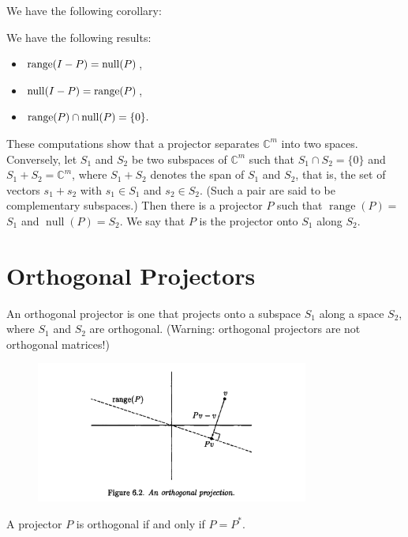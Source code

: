 We have the following corollary:

\begin{corollary}
\label{cor: P and I-P}
We have the following results: 
\begin{itemize}
    \item $\operatorname{range}(I-P) = \operatorname{null} (P)$, 
    \item $\operatorname{null} (I-P) = \operatorname{range}(P)$, 
    \item $\operatorname{range}(P) \cap \operatorname{null}(P) = \{0\} . $
\end{itemize}
\end{corollary}
These computations show that a projector separates $\mathbb{C}^m$ into two spaces. Conversely, let $S_1$ and $S_2$ be two subspaces of $\mathbb{C}^m$ such that $S_1 \cap S_2=\{0\}$ and $S_1+S_2=\mathbb{C}^m$, where $S_1+S_2$ denotes the span of $S_1$ and $S_2$, that is, the set of vectors $s_1+s_2$ with $s_1 \in S_1$ and $s_2 \in S_2$. (Such a pair are said to be complementary subspaces.) Then there is a projector $P$ such that $\operatorname{range}(P)=$ $S_1$ and $\operatorname{null}(P)=S_2$. We say that $P$ is the projector onto $S_1$ along $S_2$.

\section{Orthogonal Projectors}
An orthogonal projector is one that projects onto a subspace $S_1$ along a space $S_2$, where $S_1$ and $S_2$ are orthogonal. (Warning: orthogonal projectors are not orthogonal matrices!)

\begin{figure}[H]
    \centering
    \includegraphics[width=0.8\textwidth]{figures/6-2.png}
\end{figure}


\begin{theorem}
\label{thm: orthogonal projector}
A projector $P$ is orthogonal if and only if $P=P^*$. 
\end{theorem}

